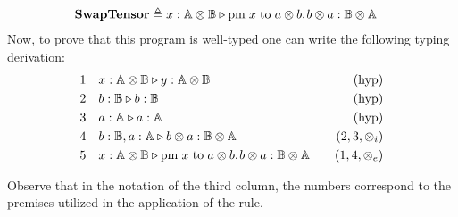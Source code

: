\begin{example}
\begin{comment}
\end{split}
\end{equation*}
\end{comment}
\begin{equation*}
\begin{split}
&  \textbf{SwapTensor} \triangleq x : \mathbb{A} \otimes  \mathbb{B}  \triangleright \text{pm} \hspace{3 pt} x \hspace{3 pt} \text{to} \hspace{3 pt} a \otimes b. \hspace{1pt} b \otimes a : \mathbb{B} \otimes \mathbb{A}
\end{split}
\end{equation*}
Now, to prove that this program is well-typed one can write the following typing derivation:
\begin{equation*}
\begin{split}
1 \hspace{10 pt} & x : \mathbb{A} \otimes \mathbb{B} \triangleright   y : \mathbb{A} \otimes \mathbb{B} \hspace{10 pt} & {(\text{hyp})} \\
2 \hspace{10 pt} &  b : \mathbb{B} \triangleright   b : \mathbb{B} \hspace{10 pt}&{(\text{hyp})} \\
3 \hspace{10 pt} &   a : \mathbb{A} \triangleright  a : \mathbb{A} \hspace{10 pt}&{(\text{hyp})} \\
4 \hspace{10 pt} &   b : \mathbb{B},a : \mathbb{A} \triangleright b \otimes a : \mathbb{B} \otimes \mathbb{A} \hspace{10pt} &\text{($2,3,\otimes_i$)} \\
5\hspace{10 pt}& x : \mathbb{A} \otimes \mathbb{B}  \triangleright \text{pm} \hspace{3 pt} x \hspace{3 pt} \text{to} \hspace{3 pt} a \otimes b. \hspace{1pt} b \otimes a : \mathbb{B} \otimes \mathbb{A}& \hspace{10pt} \text{($1,4,\otimes_e$)}
\end{split}
\end{equation*}


Observe that in the notation of the third column, the numbers correspond to the premises utilized in the application of the rule.
\end{example}

